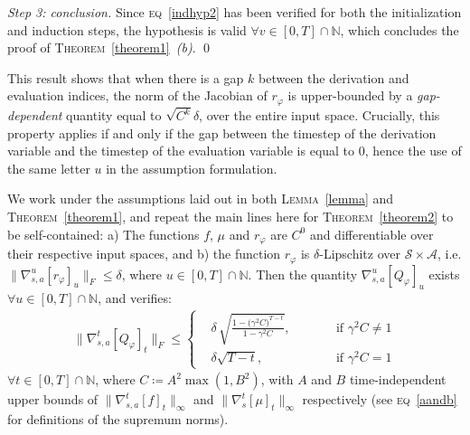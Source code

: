\emph{Step 3: conclusion.} Since \textsc{eq}~\ref{indhyp2} has been verified for both the
initialization and induction steps,
the hypothesis is valid
$\forall v \in [0, T] \cap \mathbb{N}$, which concludes the proof of
\textsc{Theorem}~\ref{theorem1}~\emph{(b)}. \qed

This result shows that when there is a gap $k$ between the derivation and evaluation indices,
the norm of the Jacobian of $r_\varphi$ is upper-bounded by a \emph{gap-dependent}
quantity equal to $\sqrt{C^k} \delta$, over the entire input space.
Crucially, this property applies if and only if the gap between the
timestep of the derivation variable and the timestep of the evaluation variable is
equal to $0$, hence the use of the same letter $u$ in the assumption formulation.

\begin{theorem}
\label{theorem2}
We work under the assumptions laid out in
both \textsc{Lemma}~\ref{lemma} and \textsc{Theorem}~\ref{theorem1}, and repeat
the main lines here
for \textsc{Theorem}~\ref{theorem2} to be self-contained:
a) The functions $f$, $\mu$ and $r_\varphi$ are $C^0$ and differentiable
over their respective input spaces,
and b) the function $r_\varphi$ is $\delta$-Lipschitz
over $\mathcal{S} \times \mathcal{A}$, i.e.
$\lVert \nabla_{s,a}^u[r_\varphi]_u \rVert _F \leq \delta$,
where $u \in [0, T] \cap \mathbb{N}$.
Then the quantity $\nabla_{s,a}^u[Q_\varphi]_u$ exists
$\forall u \in [0, T] \cap \mathbb{N}$,
and verifies:
\begin{align}
\lVert \nabla_{s,a}^t[Q_\varphi]_t \rVert _F
\leq
\left\{
\begin{aligned}
&\delta \, \sqrt{\frac{1 - \big( \gamma^2 C \big)^{T - t}}{1 - \gamma^2 C}},
&\qquad  &\text{if $\gamma^2 C \neq 1$} \\
&\delta\sqrt{T - t},
&\qquad &\text{if $\gamma^2 C = 1$}
\end{aligned}
\right.
\end{align}
$\forall t \in [0, T] \cap \mathbb{N}$,
where
$C \coloneqq A^2 \max(1, B^2)$, with $A$ and $B$ time-independent upper bounds of
$\lVert\nabla_{s,a}^t[f]_t\rVert _\infty$ and $\lVert\nabla_s^t[\mu]_t\rVert _\infty$
respectively
(see \textsc{eq}~\ref{aandb} for definitions of the supremum norms).
\end{theorem}

